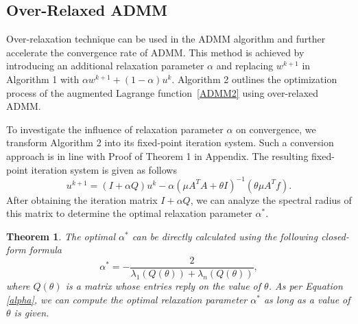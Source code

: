 \documentclass[letterpaper]{article} %
\newtheorem{theorem}{Theorem}
\begin{document}
\subsection{Over-Relaxed ADMM}
Over-relaxation technique can be used in the ADMM algorithm and further accelerate the convergence rate of ADMM. This method is achieved by introducing an additional relaxation parameter $\alpha$ and replacing $w^{k+1}$ in Algorithm 1 with $\alpha w^{k+1}+\left(1-\alpha\right)u^k$. Algorithm 2 outlines  the optimization process of the augmented Lagrange function~\eqref{ADMM2} using over-relaxed ADMM.
\begin{table}[t]
	\label{OR}
	\centering
\end{table}

To investigate the influence of relaxation parameter $\alpha$ on convergence, we transform Algorithm 2 into its fixed-point iteration system. Such a conversion approach is in line with Proof of Theorem 1 in Appendix. The resulting fixed-point iteration system is given as follows
\begin{equation*}
	u^{k+1} = \left(I+ \alpha Q\right) u^{k}- \alpha\left(\mu A^T A+\theta I\right)^{-1}\left(\theta\mu A^T f\right).
\end{equation*}
After obtaining the iteration matrix $I+ \alpha Q$, we can analyze the spectral radius of this matrix to determine the optimal relaxation parameter $\alpha^*$.

\begin{theorem}
The optimal $\alpha^*$ can be directly calculated using the following closed-form formula
\begin{equation}\label{alpha}
	\alpha^* = -\frac{2}{\lambda_1\left(Q\left(\theta\right)\right)+\lambda_n\left(Q\left(\theta\right)\right)},
\end{equation}
where $Q(\theta)$ is a matrix whose entries reply on the value of $\theta$. As per Equation \eqref{alpha}, we can compute the optimal relaxation parameter $\alpha^*$ as long as a value of $\theta$ is given.
\end{theorem}
\end{document}
